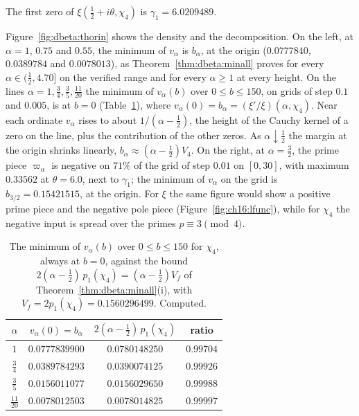 The first zero of $\xi(\frac12+i\theta,\chi_4)$ is $\gamma_1=6.0209489$.

Figure~\ref{fig:dbeta:thorin} shows the density and the decomposition. On the left, at $\alpha=1$, $0.75$ and $0.55$, the minimum of $v_\alpha$ is $b_\alpha$, at the origin ($0.0777840$, $0.0389784$ and $0.0078013$), as Theorem~\ref{thm:dbeta:minall} proves for every $\alpha\in(\frac12,4.70]$ on the verified range and for every $\alpha\ge1$ at every height. On the lines $\alpha=1,\tfrac34,\tfrac35,\tfrac{11}{20}$ the minimum of $v_\alpha(b)$ over $0\le b\le150$, on grids of step $0.1$ and $0.005$, is at $b=0$ (Table~\ref{gl:tab:sinsqmin}), where $v_\alpha(0)=b_\alpha=(\xi'/\xi)(\alpha,\chi_4)$. Near each ordinate $v_\alpha$ rises to about $1/(\alpha-\frac12)$, the height of the Cauchy kernel of a zero on the line, plus the contribution of the other zeros. As $\alpha\downarrow\frac12$ the margin at the origin shrinks linearly, $b_\alpha\approx(\alpha-\frac12)V_4$. On the right, at $\alpha=\frac32$, the prime piece $\varpi_\alpha$ is negative on $71\%$ of the grid of step $0.01$ on $[0,30]$, with maximum $0.33562$ at $\theta=6.0$, next to $\gamma_1$; the minimum of $v_\alpha$ on the grid is $b_{3/2}=0.15421515$, at the origin. For $\xi$ the same figure would show a positive prime piece and the negative pole piece (Figure~\ref{fig:ch16:lfunc}), while for $\chi_4$ the negative input is spread over the primes $p\equiv3\pmod4$.

\begin{table}[htbp]
\centering\small
\begin{tabular}{cccc}
\toprule
$\alpha$ & $v_\alpha(0)=b_\alpha$ & $2(\alpha-\tfrac12)\,p_1(\chi_4)$ & ratio\\
\midrule
$1$ & $0.0777839900$ & $0.0780148250$ & $0.99704$\\
$\tfrac34$ & $0.0389784293$ & $0.0390074125$ & $0.99926$\\
$\tfrac35$ & $0.0156011077$ & $0.0156029650$ & $0.99988$\\
$\tfrac{11}{20}$ & $0.0078012503$ & $0.0078014825$ & $0.99997$\\
\bottomrule
\end{tabular}
\caption{The minimum of $v_\alpha(b)$ over $0\le b\le150$ for $\chi_4$, always at $b=0$, against the bound $2(\alpha-\tfrac12)\,p_1(\chi_4)=(\alpha-\tfrac12)V_f$ of Theorem~\ref{thm:dbeta:minall}(i), with $V_f=2p_1(\chi_4)=0.1560296499$. Computed.}
\label{gl:tab:sinsqmin}
\end{table}

